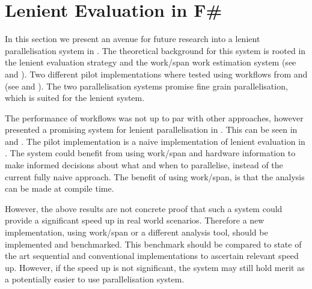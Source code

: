 \section{Lenient Evaluation in F\#}
In this section we present an avenue for future research into a lenient parallelisation system in \fs. The theoretical background for this system is rooted in the lenient evaluation strategy and the work/span work estimation system (see  and ). Two different pilot implementations where tested using  workflows from \fs and    (see  and ). The two parallelisation systems promise fine grain parallelisation, which is suited for the lenient system.

The performance of  workflows was not up to par with other approaches, however  presented a promising system for lenient parallelisation in \fs. This can be seen in  and . The pilot implementation is a naive implementation of lenient evaluation in \fs. The system could benefit from using work/span and hardware information to make informed decisions about what and when to parallelise, instead of the current fully naive approach. The benefit of using work/span, is that the analysis can be made at compile time.

However, the above results are not concrete proof that such a system could provide a significant speed up in real world scenarios. Therefore a new implementation, using work/span or a different analysis tool, should be implemented and benchmarked. This benchmark should be compared to state of the art sequential and conventional implementations to  ascertain relevant speed up. However, if the speed up is not significant, the system may still hold merit as a potentially easier to use parallelisation system.
